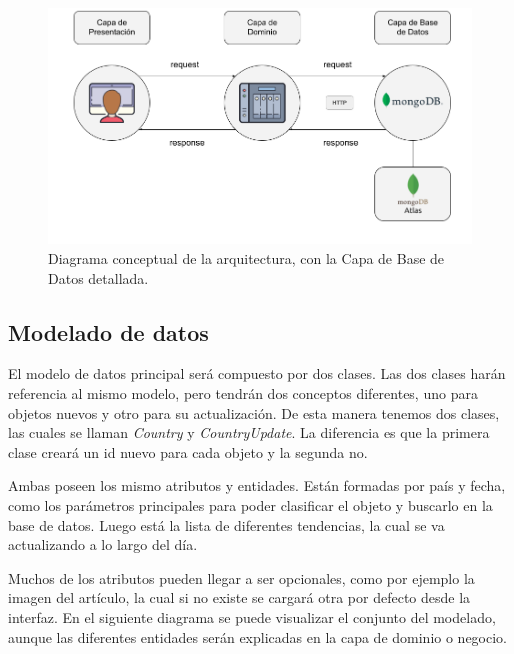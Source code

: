 \vspace{0.3cm}

\begin{figure}[H]
    \centering
    \myfloatalign
    \includegraphics[width=1\textwidth]{gfx/DiagramaRutas1.png}
    \caption[Diagrama conceptual con más detalle (1)]{Diagrama conceptual de la arquitectura, con la Capa de Base de Datos detallada.}\label{gfx:DiagramaRutas1}
\end{figure}

\subsection{Modelado de datos}
El modelo de datos principal será compuesto por dos clases. Las dos clases harán referencia al mismo modelo, pero tendrán dos conceptos diferentes, uno para objetos nuevos y otro para su actualización. De esta manera tenemos dos clases, las cuales se llaman \textit{Country} y \textit{CountryUpdate}. La diferencia es que la primera clase creará un id nuevo para cada objeto y la segunda no.

\vspace{0.3cm}

Ambas poseen los mismo atributos y entidades. Están formadas por país y fecha, como los parámetros principales para poder clasificar el objeto y buscarlo en la base de datos. Luego está la lista de diferentes tendencias, la cual se va actualizando a lo largo del día.

\vspace{0.3cm}

Muchos de los atributos pueden llegar a ser opcionales, como por ejemplo la imagen del artículo, la cual si no existe se cargará otra por defecto desde la interfaz. En el siguiente diagrama se puede visualizar el conjunto del modelado, aunque las diferentes entidades serán explicadas en la capa de dominio o negocio.

